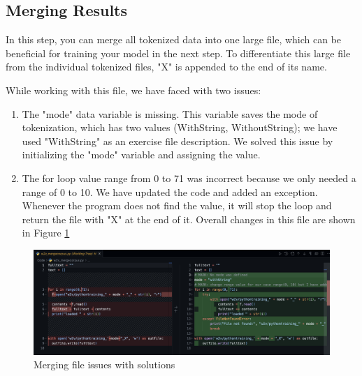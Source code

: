 \subsection{\textbf{Merging Results}}
In this step, you can merge all tokenized data into one large file, which can be beneficial for training your model in the next step. To differentiate this large file from the individual tokenized files, "X" is appended to the end of its name.

While working with this file, we have faced with two issues:
\newline
\begin{enumerate}
 \item The "mode" data variable is missing. This variable saves the mode of tokenization, which has two values (WithString, WithoutString); we have used "WithString" as an exercise file description. We solved this issue by initializing the "mode" variable and assigning the value.
 \item The for loop value range from 0 to 71 was incorrect because we only needed a range of 0 to 10.  We have updated the code and added an exception. Whenever the program does not find the value, it will stop the loop and return the file with "X" at the end of it. Overall changes in this file are shown in Figure \ref{fig: Figure6}
\end{enumerate}

\begin{figure}
    \centering
    \includegraphics[width=1\linewidth]{pictures/mergin_issues.png}
    \caption{Merging file issues with solutions}
    \label{fig: Figure6}
\end{figure}

